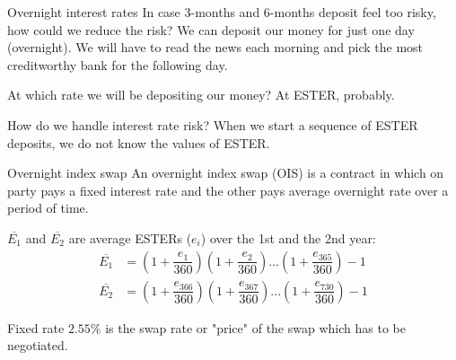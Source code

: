 \documentclass{beamer}
\renewcommand{\EUR}[1]{\textup{\euro}#1}
\begin{document}
\begin{frame}{Overnight interest rates}
\justify
In case 3-months and 6-months deposit feel too risky, how could we reduce the risk? We can deposit our money for just one day (overnight). We will have to read the news each morning and pick the most creditworthy bank for the following day.

\justify
At which rate we will be depositing our money? At ESTER, probably.

\justify
How do we handle interest rate risk? When we start a sequence of ESTER deposits, we do not know the values of ESTER.
\end{frame}



\begin{frame}{Overnight index swap}
\justify
An \alert{overnight index swap (OIS)} is a contract in which on party pays a fixed interest rate and the other pays average overnight rate over a period of time.
\justify
\centering
{}

\justify
$\overline{E_1}$ and $\overline{E_2}$ are average ESTERs ($e_i$) over the 1st and the 2nd year:
\begin{align*}
\overline{E_1} &= \left(1 + \dfrac{e_1}{360}\right)
\left(1 + \dfrac{e_2}{360}\right)
...
\left(1 + \dfrac{e_{365}}{360}\right) - 1 \\
\overline{E_2} &= \left(1 + \dfrac{e_{366}}{360}\right)
\left(1 + \dfrac{e_{367}}{360}\right)...
\left(1 + \dfrac{e_{730}}{360}\right) - 1
\end{align*}

\justify
Fixed rate $2.55\%$ is the swap rate or "price" of the swap which has to be negotiated.
\end{frame}
\end{document}
